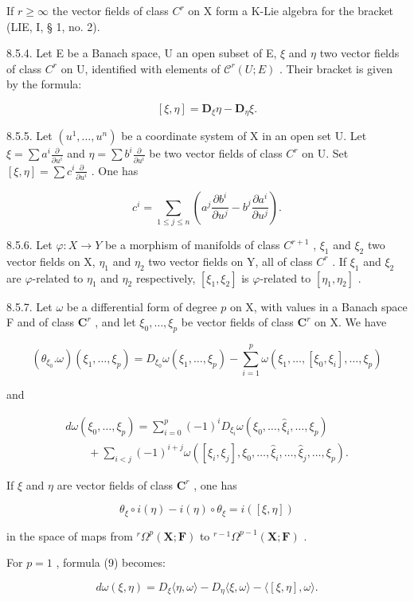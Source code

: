 If \(r \geqslant \infty\) the vector fields of class \(C^r\) on X form a K-Lie algebra for the bracket (LIE, I, § 1, no. 2).

8.5.4. Let E be a Banach space, U an open subset of E, \(\xi\) and \(\eta\) two vector fields of class \(C^{r}\) on U, identified with elements of \(\mathcal{C}^{r}(U;E)\) . Their bracket is given by the formula:

\[
[ \xi , \eta ] = \mathbf {D} _ {\xi} \eta - \mathbf {D} _ {\eta} \xi .\tag{6}
\]

8.5.5. Let \((u^1, \ldots, u^n)\) be a coordinate system of X in an open set U. Let \(\xi = \sum a^i \frac{\partial}{\partial u^i}\) and \(\eta = \sum b^i \frac{\partial}{\partial u^i}\) be two vector fields of class \(C^r\) on U. Set \([\xi, \eta] = \sum c^i \frac{\partial}{\partial u^i}\) . One has

\[
c ^ {i} = \sum_ {1 \leqslant j \leqslant n} \left(a ^ {j} \frac {\partial b ^ {i}}{\partial u ^ {j}} - b ^ {j} \frac {\partial a ^ {i}}{\partial u ^ {j}}\right).\tag{7}
\]

8.5.6. Let \(\varphi: X \to Y\) be a morphism of manifolds of class \(C^{r+1}\) , \(\xi_1\) and \(\xi_2\) two vector fields on X, \(\eta_{1}\) and \(\eta_{2}\) two vector fields on Y, all of class \(C^r\) . If \(\xi_{1}\) and \(\xi_{2}\) are \(\varphi\)-related to \(\eta_{1}\) and \(\eta_{2}\) respectively, \([\xi_{1}, \xi_{2}]\) is \(\varphi\)-related to \([\eta_{1}, \eta_{2}]\) .

8.5.7. Let \(\omega\) be a differential form of degree \(p\) on X, with values in a Banach space F and of class \(\mathbf{C}^r\) , and let \(\xi_0, \ldots, \xi_p\) be vector fields of class \(\mathbf{C}^r\) on X. We have

\[
(\theta_ {\xi_ {0}}. \omega) (\xi_ {1}, \dots , \xi_ {p}) = D _ {\xi_ {0}} \omega (\xi_ {1}, \dots , \xi_ {p}) - \sum_ {i = 1} ^ {p} \omega (\xi_ {1}, \dots , [ \xi_ {0}, \xi_ {i} ], \dots , \xi_ {p})\tag{8}
\]

and

\[
\begin{array}{l} d \omega (\xi_ {0}, \dots , \xi_ {p}) = \sum_ {i = 0} ^ {p} (- 1) ^ {i} D _ {\xi_ {i}} \omega (\xi_ {0}, \dots , \hat {\xi} _ {i}, \dots , \xi_ {p}) \\ \qquad + \sum_ {i <   j} (- 1) ^ {i + j} \omega ([ \xi_ {i}, \xi_ {j} ], \xi_ {0}, \dots , \hat {\xi} _ {i}, \dots , \hat {\xi} _ {j}, \dots , \xi_ {p}). \end{array}\tag{9}
\]

If \(\xi\) and \(\eta\) are vector fields of class \(\mathbf{C}^r\) , one has

\[
\theta_ {\xi} \circ i (\eta) - i (\eta) \circ \theta_ {\xi} = i ([ \xi , \eta ])\tag{10}
\]

in the space of maps from \(^{r}\Omega^{p}(\mathbf{X};\mathbf{F})\) to \(^{r-1}\Omega^{p-1}(\mathbf{X};\mathbf{F})\) .

For \(p = 1\) , formula (9) becomes:

\[
d \omega (\xi , \eta) = D _ {\xi} \langle \eta , \omega \rangle - D _ {\eta} \langle \xi , \omega \rangle - \langle [ \xi , \eta ], \omega \rangle .\tag{11}
\]

